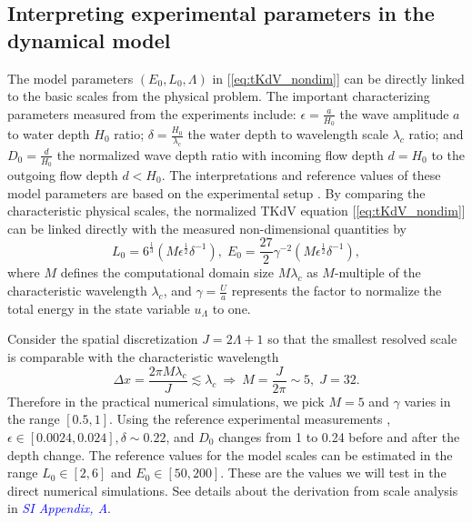 \documentclass[9pt,twocolumn,twoside,lineno]{pnas-new}
\begin{document}


\subsection{Interpreting experimental parameters in the dynamical model}

The model parameters $\left(E_{0},L_{0},\Lambda\right)$ in [\ref{eq:tKdV_nondim}]
can be directly linked to the basic scales from the physical problem.
The important characterizing parameters measured from the experiments
include: $\epsilon=\frac{a}{H_{0}}$ the wave amplitude $a$ to water
depth $H_{0}$ ratio; $\delta=\frac{H_{0}}{\lambda_{c}}$ the water
depth to wavelength scale $\lambda_{c}$ ratio; and $D_{0}=\frac{d}{H_{0}}$
the normalized wave depth ratio with incoming flow depth $d=H_{0}$
to the outgoing flow depth $d<H_{0}$. The interpretations and reference
values of these model parameters are based on the experimental setup
\cite{bolles2018anomalous}. By comparing the characteristic physical
scales, the normalized TKdV equation [\ref{eq:tKdV_nondim}] can be
linked directly with the measured non-dimensional quantities by
\begin{equation}
L_{0}=6^{\frac{1}{3}}\left(M\epsilon^{\frac{1}{2}}\delta^{-1}\right),\;E_{0}=\frac{27}{2}\gamma^{-2}\left(M\epsilon^{\frac{1}{2}}\delta^{-1}\right),\label{eq:params}
\end{equation}
where $M$ defines the computational domain size $M\lambda_{c}$
as $M$-multiple of the characteristic wavelength $\lambda_{c}$,
and $\gamma=\frac{U}{a}$ represents the factor to normalize the total
energy in the state variable $u_{\Lambda}$ to one. 

Consider the spatial discretization $J=2\Lambda+1$ so that the smallest
resolved scale is comparable with the characteristic wavelength
\[
\Delta x=\frac{2\pi M\lambda_{c}}{J}\lesssim\lambda_{c}\:\Rightarrow\:M=\frac{J}{2\pi}\sim5,\;J=32.
\]
Therefore in the practical numerical simulations, we pick $M=5$ and
$\gamma$ varies in the range $\left[0.5,1\right]$. Using the reference
experimental measurements \cite{bolles2018anomalous}, $\epsilon\in\left[0.0024,0.024\right],\delta\sim0.22$,
and $D_{0}$ changes from 1 to 0.24 before and after the depth change.
The reference values for the model scales can be estimated in the
range $L_{0}\in\left[2,6\right]$ and $E_{0}\in\left[50,200\right]$.
These are the values we will test in the direct numerical simulations.
See details about the derivation from scale analysis in \textcolor{blue}{\emph{SI Appendix, A}}.
\end{document}
